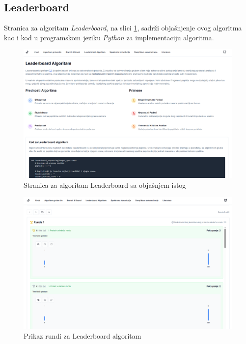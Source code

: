 \documentclass[12pt,oneside]{memoir}
\begin{document}
\subsection{Leaderboard}
Stranica za algoritam \emph{Leaderboard}, na slici \ref{fig:leaderboard_1}, sadrži objašnjenje ovog algoritma kao i kod u programskom jeziku \emph{Python} za implementaciju algoritma.
\begin{figure}[H]
\centering
\includegraphics[width=1\textwidth]{images/leaderboard_1.png}
\caption{Stranica za algoritam Leaderboard sa objašnjem istog}
\label{fig:leaderboard_1}
\end{figure}

\begin{figure}[H]
\centering
\includegraphics[width=1\textwidth,height=0.4\textheight]{images/leaderboard_2.png}
\caption{Prikaz rundi za Leaderboard algoritam}
\label{fig:leaderboard_2}
\end{figure}
\end{document}
